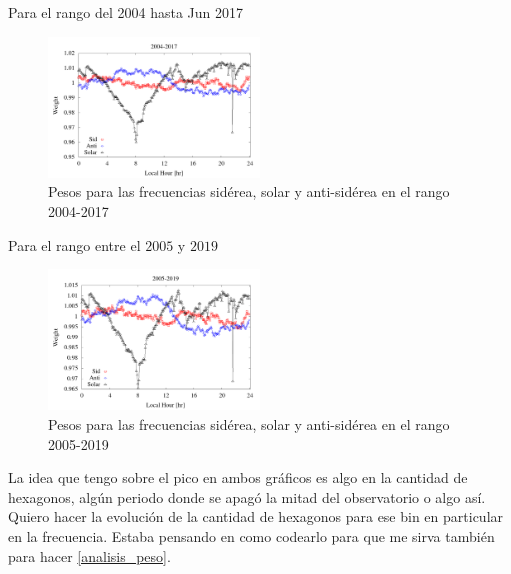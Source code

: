 Para el rango del 2004 hasta Jun 2017

\begin{figure}[H]
	\centering
	\includegraphics[width=0.5\textwidth]{weigth2004-2017.png}
	\caption{Pesos para las frecuencias sidérea, solar y anti-sidérea en el rango 2004-2017}
	\label{fig:pesos_2017}
\end{figure}



Para el rango entre el $2005$ y $2019$
\begin{figure}[H]
	\centering
	\includegraphics[width=0.5\textwidth]{weigth2005-2019.png}
	\caption{Pesos para las frecuencias sidérea, solar y anti-sidérea en el rango 2005-2019}
	\label{fig:pesos_2019}
\end{figure}




La idea que tengo sobre el pico en ambos gráficos es algo en la cantidad de hexagonos, algún periodo donde se apagó la mitad del observatorio o algo así. Quiero hacer la evolución de la cantidad de hexagonos para ese bin en particular en la frecuencia. Estaba pensando en como codearlo para que me sirva también para hacer \ref{analisis_peso}.




